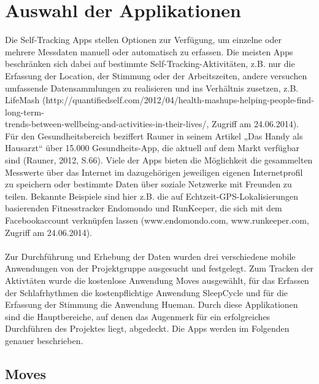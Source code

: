 
\chapter{Auswahl der Applikationen}
\label{ch:Apps}

Die Self-Tracking Apps stellen Optionen zur Verfügung, um einzelne oder mehrere Messdaten manuell oder automatisch zu erfassen. 
Die meisten Apps beschränken sich dabei auf bestimmte Self-Tracking-Aktivitäten, z.B. nur die Erfassung der Location, der Stimmung oder der Arbeitszeiten, andere versuchen umfassende Datensammlungen zu realisieren und ins Verhältnis zusetzen, z.B. LifeMash (http://quantifiedself.com/2012/04/health-mashups-helping-people-find-long-term-
\\
trends-between-wellbeing-and-activities-in-their-lives/, Zugriff am 24.06.2014). 
Für den Gesundheitsbereich beziffert Rauner in seinem Artikel „Das Handy als Hausarzt“ über 15.000 Gesundheits-App, die aktuell auf dem Markt verfügbar sind (Rauner, 2012, S.66). 
Viele der Apps bieten die Möglichkeit die gesammelten Messwerte über das Internet im dazugehörigen jeweiligen eigenen Internetprofil zu speichern oder bestimmte Daten über soziale Netzwerke mit Freunden zu teilen. 
Bekannte Beispiele sind hier z.B. die auf Echtzeit-GPS-Lokalisierungen basierenden Fitnesstracker Endomondo und RunKeeper, die sich mit dem Facebookaccount verknüpfen lassen (www.endomondo.com, www.runkeeper.com, Zugriff am 24.06.2014). 
\\
\\
Zur Durchführung und Erhebung der Daten wurden drei verschiedene mobile Anwendungen von der Projektgruppe ausgesucht und festgelegt.
Zum Tracken der Aktivtäten wurde die kostenlose Anwendung Moves ausgewählt, für das Erfassen der Schlafrhythmen die kostenpflichtige Anwendung SleepCycle und für die Erfassung der Stimmung die Anwendung Hueman.
Durch diese Applikationen sind die Hauptbereiche, auf denen das Augenmerk für ein erfolgreiches Durchführen des Projektes liegt, abgedeckt.
Die Apps werden im Folgenden genauer beschrieben.


\section{Moves}
\label{ch:Apps:sec:Moves}

